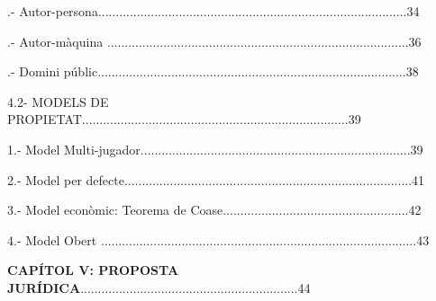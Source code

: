 \documentclass[12pt]{article}
\renewcommand{\_}{\kern-1.5pt\textunderscore\kern-1.5pt}
\begin{document}
\vspace{\baselineskip}

\vspace{\baselineskip}
\begin{justify}
.- Autor-persona........................................................................................34
\end{justify}\par


\vspace{\baselineskip}
\begin{justify}
.- Autor-màquina ......................................................................................36
\end{justify}\par


\vspace{\baselineskip}
\begin{justify}
.- Domini públic........................................................................................38
\end{justify}\par


\vspace{\baselineskip}
\begin{justify}
4.2- MODELS DE PROPIETAT............................................................................39
\end{justify}\par


\vspace{\baselineskip}
1.- Model Multi-jugador.............................................................................39\par


\vspace{\baselineskip}
2.- Model per defecte..................................................................................41\par


\vspace{\baselineskip}
3.- Model econòmic: Teorema de Coase.....................................................42\par


\vspace{\baselineskip}
4.- Model Obert ..........................................................................................43\par


\vspace{\baselineskip}
\begin{justify}
\textbf{CAPÍTOL V: PROPOSTA JURÍDICA}..............................................................44
\end{justify}\par
\end{document}
